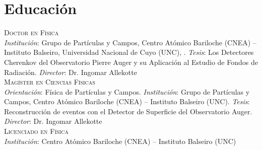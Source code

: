 \section*{Educación}
\noindent
{}\textsc{Doctor en Física}\\
{\emph{Institución}}: Grupo de Partículas y Campos, Centro Atómico Bariloche (CNEA) -- Instituto Balseiro, Universidad Nacional de Cuyo (UNC), . {\emph{Tesis}}: Los Detectores Cherenkov del Observatorio Pierre Auger y su Aplicación al Estudio de Fondos de Radiación. {\emph{Director}}: Dr. Ingomar Allekotte\\
\textsc{Magíster en Ciencias Físicas}\\
{\emph{Orientación}}: Física de Partículas y Campos. {\emph{Institución}}: Grupo de Partículas y Campos, Centro Atómico Bariloche (CNEA) -- Instituto Balseiro (UNC). {\emph{Tesis}}: Reconstrucción de eventos con el Detector de Superficie del Observatorio Auger. {\emph{Director}}: Dr. Ingomar Allekotte\\
\textsc{Licenciado en Física}\\
{\emph{Institución}}: Centro Atómico Bariloche (CNEA) -- Instituto Balseiro (UNC)\\
\fi